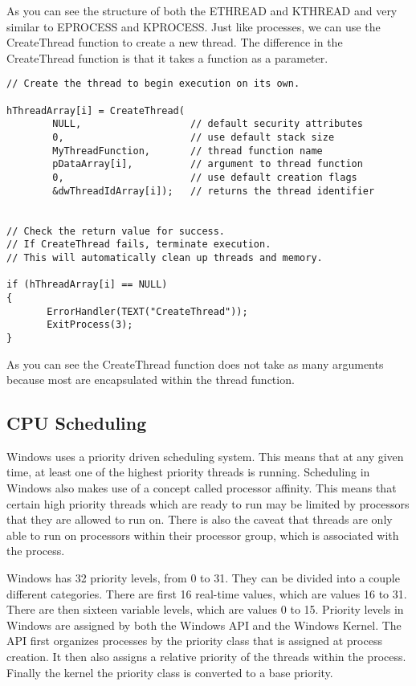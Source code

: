 \documentclass[letterpaper,10pt,titlepage,draftclsnofoot,onecolumn]{IEEEtran}
\begin{document}
As you can see the structure of both the ETHREAD and KTHREAD and very similar to EPROCESS and KPROCESS. Just like processes, we can use the CreateThread function to create a new thread. The difference in the CreateThread function is that it takes a function as a parameter.

\begin{lstlisting}
// Create the thread to begin execution on its own.

hThreadArray[i] = CreateThread( 
        NULL,                   // default security attributes
        0,                      // use default stack size  
        MyThreadFunction,       // thread function name
        pDataArray[i],          // argument to thread function 
        0,                      // use default creation flags 
        &dwThreadIdArray[i]);   // returns the thread identifier 


// Check the return value for success.
// If CreateThread fails, terminate execution. 
// This will automatically clean up threads and memory. 

if (hThreadArray[i] == NULL) 
{
       ErrorHandler(TEXT("CreateThread"));
       ExitProcess(3);
}
\end{lstlisting}

As you can see the CreateThread function does not take as many arguments because most are encapsulated within the thread function. 

\subsection{CPU Scheduling}

Windows uses a priority driven scheduling system. This means that at any given time, at least one of the highest priority threads is running. Scheduling in Windows also makes use of a concept called processor affinity. \cite{windows} This means that certain high priority threads which are ready to run may be limited by processors that they are allowed to run on. There is also the caveat that threads are only able to run on processors within their processor group, which is associated with the process. 

Windows has 32 priority levels, from 0 to 31. They can be divided into a couple different categories. There are first 16 real-time values, which are values 16 to 31. There are then sixteen variable levels, which are values 0 to 15. Priority levels in Windows are assigned by both the Windows API and the Windows Kernel. The API first organizes processes by the priority class that is assigned at process creation. It then also assigns a relative priority of the threads within the process. Finally the kernel the priority class is converted to a base priority. \cite{windows}
\end{document}

